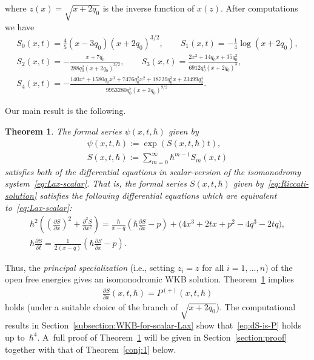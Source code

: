 \documentclass[pdftex]{sigma}
\newtheorem{thm}{Theorem}[section]
\theoremstyle{definition}
\numberwithin{equation}{section}
\def\p{\partial}
\begin{document}
where $z(x) = \sqrt{x+2q_{0}}$ is the inverse function of $x(z)$.
After computations we have
\begin{gather*}
S_{0}(x,t)  =  \frac{4}{5}(x-3q_{0})(x+2q_{0})^{3/2}, \qquad
S_{1}(x,t)  =  - \frac{1}{4}\log(x+2q_{0}), \\
S_{2}(x,t)  =  -\frac{x+7q_{0}}{288q_{0}^{2}(x+2q_{0})^{3/2}}, \qquad
S_{3}(x,t)  =  \frac{2x^{2}+14q_{0}x+35q_{0}^{2}}
{6912q_{0}^{4}(x+2q_{0})^{3}}, \\
S_{4}(x,t)  =  -\frac{140x^{4}+1580q_{0}x^{3}
+ 7476 q_{0}^{2}x^{2}+18739q_{0}^{3}x+23499q_{0}^{4}}
{9953280 q_{0}^{7}(x+2q_{0})^{9/2}}.
\end{gather*}

Our main result is the following.

\begin{thm} \label{conj:2}
The formal series $\psi(x,t,\hbar)$ given by
\begin{gather}
\psi(x,t,\hbar)   :=    \exp  ( S(x,t,\hbar)  t),
\label{eq:wave-function} \\
S(x,t,\hbar)   :=   \sum_{m = 0}^{\infty} \hbar^{m-1} S_{m}(x,t)
\label{eq:Riccati-solution}
\end{gather}
satisfies both of the differential equations in
scalar-version of the isomonodromy system~\eqref{eq:Lax-scalar}.
That is, the formal series $S(x,t,\hbar)$ given by~\eqref{eq:Riccati-solution} satisfies
the following differential equations which are equivalent to~\eqref{eq:Lax-scalar}:
\begin{gather}  \label{eq:Riccati-2}
 \hbar^{2}\left( \left(\frac{\p S}{\p x}\right)^{2} +
\frac{\p^{2} S}{\p x^{2}} \right)   =
\frac{\hbar}{x-q} \left( \hbar \frac{\p S}{\p x} - p \right)
+ \big(4x^{3}+2t x + p^{2} - 4q^{3}-2tq\big),   \\
\label{eq:dt-Riccati-2}
 \hbar\frac{\p S}{\p t}   =   \frac{1}{2(x-q)} \left(
\hbar \frac{\p S}{\p x} - p \right).
\end{gather}
\end{thm}

Thus, the {\em principal specialization}
(i.e., setting $z_{i} = z$ for all $i = 1,\dots,n$)
of the open free energies gives an isomonodromic WKB solution.
Theorem~\ref{conj:2} implies
\begin{gather} \label{eq:dS-is-P}
\frac{\p S}{\p x}(x,t,\hbar) = P^{(+)}(x,t,\hbar)
\end{gather}
holds (under a suitable choice of the branch of $\sqrt{x+2q_{0}}$).
The computational results in Section~\ref{subsection:WKB-for-scalar-Lax}
show that~\eqref{eq:dS-is-P}
holds up to~$\hbar^{4}$. A~full proof of Theorem~\ref{conj:2}
will be given in Section~\ref{section:proof} together
with that of Theorem~\ref{conj:1} below.
\end{document}
